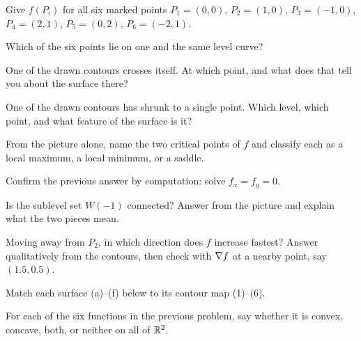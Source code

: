 \begin{problems}[resume]
  \item Give $f(P_{i})$ for all six marked points
        $P_{1}=(0,0)$, $P_{2}=(1,0)$, $P_{3}=(-1,0)$, $P_{4}=(2,1)$,
        $P_{5}=(0,2)$, $P_{6}=(-2,1)$.
  \item Which of the six points lie on one and the same level curve?
  \item One of the drawn contours crosses itself. At which point, and what
        does that tell you about the surface there?
  \item One of the drawn contours has shrunk to a single point. Which
        level, which point, and what feature of the surface is it?
  \item From the picture alone, name the two critical points of $f$ and
        classify each as a local maximum, a local minimum, or a saddle.
  \item Confirm the previous answer by computation: solve
        $f_{x}=f_{y}=0$.
  \item Is the sublevel set $W(-1)$ connected? Answer from the picture and
        explain what the two pieces mean.
  \item Moving away from $P_{2}$, in which direction does $f$ increase
        fastest? Answer qualitatively from the contours, then check with
        $\nabla f$ at a nearby point, say $(1.5,0.5)$.
\end{problems}

\begin{problems}[resume]
  \item Match each surface (a)--(f) below to its contour map (1)--(6).
  \item For each of the six functions in the previous problem, say whether
        it is convex, concave, both, or neither on all of $\mathbb{R}^{2}$.
\end{problems}

\begin{gallery}
\hfill
{}\hfill
{}
\end{gallery}

